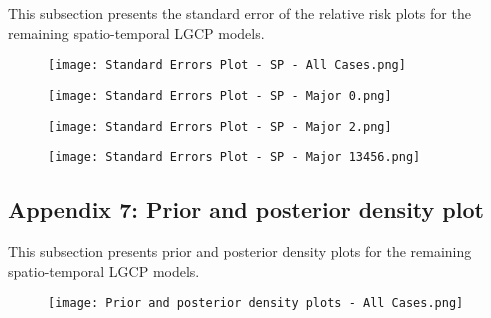 \documentclass[a4paper]{thesis}
\begin{document}
This subsection presents the standard error of the relative risk plots for the remaining spatio-temporal LGCP models.

\begin{figure}[H]
\begin{center}
\texttt{[image: Standard Errors Plot - SP - All Cases.png]}
\end{center}
\end{figure}

\begin{figure}[H]
\begin{center}
\texttt{[image: Standard Errors Plot - SP - Major 0.png]}
\end{center}
\end{figure}

\begin{figure}[H]
\begin{center}
\texttt{[image: Standard Errors Plot - SP - Major 2.png]}
\end{center}
\end{figure}

\begin{figure}[H]
\begin{center}
\texttt{[image: Standard Errors Plot - SP - Major 13456.png]}
\end{center}
\end{figure}

\newpage

\subsection{Appendix 7: Prior and posterior density plot}

This subsection presents prior and posterior density plots for the remaining spatio-temporal LGCP models.

\begin{figure}[H]
\begin{center}
\texttt{[image: Prior and posterior density plots - All Cases.png]}
\end{center}
\end{figure}
\end{document}
